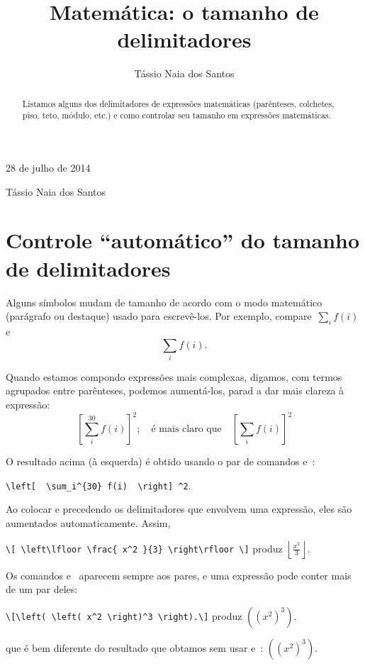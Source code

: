 \documentclass[article,openany]{memoir}
\title{Matemática: o tamanho de delimitadores}
\author{Tássio Naia dos Santos}
\newenvironment{exemplo}{\begin{center}}{\end{center}}
\begin{document}



\hfill 28 de julho de 2014

\medskip

\noindent Tássio Naia dos Santos


\bigskip

\begin{abstract}
Listamos alguns dos delimitadores de expressões matemáticas
(parênteses, colchetes, piso, teto, módulo, etc.) e como controlar seu tamanho em
expressões matemáticas.
\end{abstract}

\chapter{Controle ``automático'' do tamanho de delimitadores}

Alguns símbolos mudam de tamanho de acordo com o modo matemático
(parágrafo ou destaque) usado para escrevê-los. Por exemplo,
compare~\(\sum_i f(i)\) e
\[
\sum_i f(i).
\]

Quando estamos compondo expressões mais complexas, digamos, com termos
agrupados entre parênteses, podemos aumentá-los, parad a dar mais
clareza à expressão:
\[
\left[\sum_i^{30} f(i)\right] ^2; 
\quad \text{é mais claro que}\quad 
[\sum_i f(i)]^2
\]

O resultado acima (à esquerda) é obtido usando o par de comandos 
e~:
\begin{exemplo}
\verb/\left[  \sum_i^{30} f(i)  \right] ^2/.
\end{exemplo}
Ao colocar  e  precedendo os delimitadores que
envolvem uma expressão, eles são aumentados automaticamente. Assim,
\begin{exemplo}
\verb/\[ \left\lfloor \frac{ x^2 }{3} \right\rfloor \]/ produz 
\(\displaystyle \left\lfloor \frac{ x^2 }{3} \right\rfloor \).
\end{exemplo}

Os comandos  e~ aparecem sempre aos pares, e uma
expressão pode conter mais de um par deles: 
\begin{exemplo}
\verb/\[\left( \left( x^2 \right)^3 \right).\]/
produz
\(\displaystyle \left( \left( x^2 \right)^3 \right).\)
\end{exemplo}
que é bem diferente do resultado que obtamos sem usar 
e~: \(\displaystyle ( ( x^2 )^3 ).\)
\end{document}
